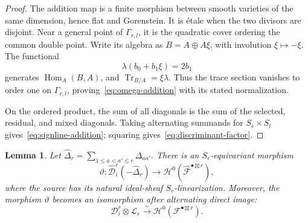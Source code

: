 \documentclass[11pt,letterpaper]{amsart}
\theoremstyle{plain}
\newtheorem{lemma}[theorem]{Lemma}
\theoremstyle{definition}
\theoremstyle{remark}
\numberwithin{equation}{section}
\begin{document}
\begin{proof}
The addition map is a finite morphism between smooth varieties of the same
dimension, hence flat and Gorenstein. It is \'etale when the two
divisors are disjoint. Near a general point of $\Gamma_{r,l}$,
it is the quadratic cover ordering the common double point.
Write its algebra as $B=A\oplus A\xi$, with involution
$\xi\mapsto-\xi$. The functional
\[
 \lambda(b_0+b_1\xi)=2b_1
\]
generates $\operatorname{Hom}_A(B,A)$, and
$\operatorname{Tr}_{B/A}=\xi\lambda$.
Thus the trace section vanishes to order one on $\Gamma_{r,l}$,
proving~\eqref{eq:omega-addition} with its stated normalization.

On the ordered product, the sum of all diagonals is the sum of the
selected, residual, and mixed diagonals. Taking alternating
summands for $S_r\times S_l$ gives~\eqref{eq:signline-addition};
squaring gives~\eqref{eq:discriminant-factor}.
\end{proof}





\begin{lemma}\label{lem:selected-vandermonde-map}
Let $\widehat\Delta_r=\sum\limits_{1\le a<a'\le r}
\Delta_{aa'}$.
There is an $S_r$-equivariant morphism
\begin{equation}\label{eq:selected-vandermonde-map}
 \vartheta:\widehat{\mathcal D}_i^r(-\widehat\Delta_r)
 \longrightarrow
 \mathcal H^0(\widehat{\mathcal F}^{\bullet\boxtimes r}),
\end{equation}
where the source has its natural ideal-sheaf $S_r$-linearization.
Moreover, the morphism $\vartheta$ becomes an isomorphism after alternating direct
image:
\begin{equation}\label{asfarfsfweADJFHBAJDHRFB}
 \mathcal D_i^r\otimes\mathscr L_r
 \xrightarrow{\sim}\mathcal H^0(\mathcal F^{\bullet\boxtimes r}).
\end{equation}
\end{lemma}
\end{document}
